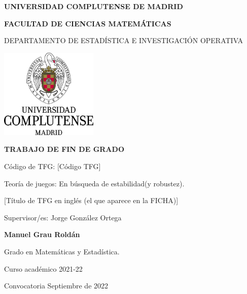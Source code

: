 \documentclass[11pt, a4paper]{article} %
\begin{document}
\begin{titlepage}
\centering
{ \bfseries \Large UNIVERSIDAD COMPLUTENSE DE MADRID}
\vspace{0.5cm}

{\bfseries  \Large FACULTAD DE CIENCIAS MATEMÁTICAS} 
\vspace{1cm}

{\large DEPARTAMENTO DE ESTADÍSTICA E INVESTIGACIÓN OPERATIVA}
\vspace{0.8cm}

{\includegraphics[width=0.35\textwidth]{logo_UCM}} %
\vspace{0.8cm}

{\bfseries \Large TRABAJO DE FIN DE GRADO}
\vspace{2cm}

{\Large Código de TFG:  [C\'odigo TFG] } \vspace{5mm}

{\Large Teoría de juegos: En búsqueda de estabilidad(y robustez).}\vspace{5mm}

{\Large [Título de TFG en ingl\'es (el que aparece en la FICHA)]}\vspace{5mm}

{\Large Supervisor/es: Jorge González Ortega }\vspace{20mm} 

{\bfseries \LARGE Manuel Grau Roldán}\vspace{5mm} 

{\large Grado en Matemáticas y Estadística.}\vspace{5mm} 

{\large Curso acad\'emico 2021-22}\vspace{5mm} 

{\large Convocatoria Septiembre de 2022}\vspace{5mm} 

\end{titlepage}
\end{document}
